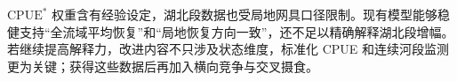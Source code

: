 $\mathrm{CPUE}^*$ 权重含有经验设定，湖北段数据也受局地网具口径限制。现有模型能够稳健支持“全流域平均恢复”和“局地恢复方向一致”，还不足以精确解释湖北段增幅。若继续提高解释力，改进内容不只涉及状态维度，标准化 CPUE 和连续河段监测更为关键；获得这些数据后再加入横向竞争与交叉摄食。
